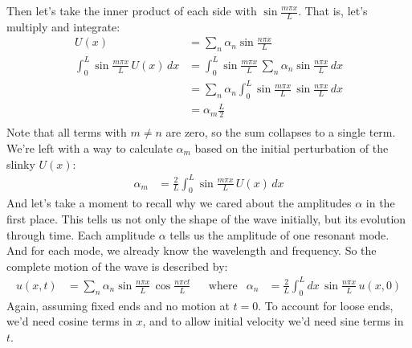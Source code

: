 \documentclass{article}
\begin{document}
Then let's take the inner product of each side with $\sin \tfrac{m \pi x}{L}$. That is, let's multiply and integrate:
\begin{align*}
    U(x) &= \displaystyle\sum_n \alpha_n \sin \tfrac{n\pi x}{L} \\
    \displaystyle \int_0^L \sin \frac{m \pi x }{L} \, U(x) \, dx &=
    \displaystyle \int_0^L \sin \frac{m \pi x }{L} \, \displaystyle\sum_n \alpha_n \sin \tfrac{n\pi x}{L} \, dx \\
    &=
    \displaystyle\sum_n \alpha_n \displaystyle \int_0^L \sin \frac{m \pi x }{L} \,  \sin \tfrac{n\pi x}{L} \, dx \\
    &=
    \alpha_m \frac{L}{2} \\
\end{align*}
Note that all terms with $m \not= n$ are zero, so the sum collapses to a single term. We're left with a way to calculate $\alpha_m$ based on the initial perturbation of the slinky $U(x)$:
\begin{align*}
    \alpha_m &= \frac{2}{L} \displaystyle \int_0^L \sin \frac{m \pi x }{L} \, U(x) \, dx
\end{align*}
And let's take a moment to recall why we cared about the amplitudes $\alpha$ in the first place. This tells us not only the shape of the wave initially, but its evolution through time. Each amplitude $\alpha$ tells us the amplitude of one resonant mode. And for each mode, we already know the wavelength and frequency. So the complete motion of the wave is described by:
\begin{align*}
    u(x, t) &= \displaystyle\sum_n \alpha_n \sin \tfrac{n\pi x}{L} \, \cos \tfrac{n\pi c t}{L} &
    &\text{where}&
    \alpha_n &= \frac{2}{L} \displaystyle \int_0^L dx \, \sin \tfrac{n \pi x }{L}  \, u(x, 0) 
\end{align*}
Again, assuming fixed ends and no motion at $t=0$. To account for loose ends, we'd need cosine terms in $x$, and to allow initial velocity we'd need sine terms in $t$. 
\end{document}
